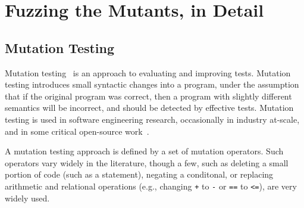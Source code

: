 \section{Fuzzing the Mutants, in Detail}


\subsection{Mutation Testing}

Mutation testing~\cite{MutationSurvey,budd1979mutation,demillo1978hints} is an approach to evaluating and improving tests.  Mutation testing introduces small syntactic changes into a program, under the assumption that if the original program was correct, then a program with slightly different semantics will be incorrect, and should be detected by effective tests.  Mutation testing is used in software engineering research, occasionally in industry at-scale, and in some critical  open-source work~\cite{mutKernel,mutGoogle,mutFacebook}.

A mutation testing approach is defined by a set of mutation operators.  Such operators vary widely in the literature, though a few, such as deleting a small portion of code (such as a statement), negating a conditonal, or replacing arithmetic and relational operations (e.g., changing {\tt +} to {\tt -} or {\tt ==} to {\tt <=}), are very widely used.